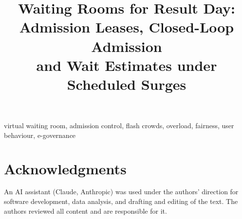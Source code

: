 \documentclass[conference]{IEEEtran}
\begin{document}
\title{Waiting Rooms for Result Day: Admission Leases, Closed-Loop Admission\\and Wait Estimates under Scheduled Surges}

\author{
\and
{}
}

\maketitle



\begin{IEEEkeywords}
virtual waiting room, admission control, flash crowds, overload, fairness, user behaviour, e-governance
\end{IEEEkeywords}








\section*{Acknowledgments}

An AI assistant (Claude, Anthropic) was used under the authors' direction for
software development, data analysis, and drafting and editing of the text.
The authors reviewed all content and are responsible for it.



\end{document}
